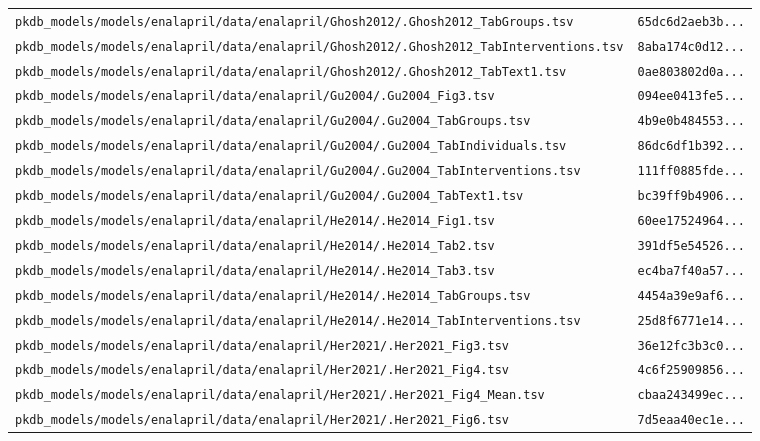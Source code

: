 \begin{longtable}{ll}
\texttt{pkdb\_models/models/enalapril/data/enalapril/Ghosh2012/.Ghosh2012\_TabGroups.tsv} & \texttt{65dc6d2aeb3b...} \\
\texttt{pkdb\_models/models/enalapril/data/enalapril/Ghosh2012/.Ghosh2012\_TabInterventions.tsv} & \texttt{8aba174c0d12...} \\
\texttt{pkdb\_models/models/enalapril/data/enalapril/Ghosh2012/.Ghosh2012\_TabText1.tsv} & \texttt{0ae803802d0a...} \\
\texttt{pkdb\_models/models/enalapril/data/enalapril/Gu2004/.Gu2004\_Fig3.tsv} & \texttt{094ee0413fe5...} \\
\texttt{pkdb\_models/models/enalapril/data/enalapril/Gu2004/.Gu2004\_TabGroups.tsv} & \texttt{4b9e0b484553...} \\
\texttt{pkdb\_models/models/enalapril/data/enalapril/Gu2004/.Gu2004\_TabIndividuals.tsv} & \texttt{86dc6df1b392...} \\
\texttt{pkdb\_models/models/enalapril/data/enalapril/Gu2004/.Gu2004\_TabInterventions.tsv} & \texttt{111ff0885fde...} \\
\texttt{pkdb\_models/models/enalapril/data/enalapril/Gu2004/.Gu2004\_TabText1.tsv} & \texttt{bc39ff9b4906...} \\
\texttt{pkdb\_models/models/enalapril/data/enalapril/He2014/.He2014\_Fig1.tsv} & \texttt{60ee17524964...} \\
\texttt{pkdb\_models/models/enalapril/data/enalapril/He2014/.He2014\_Tab2.tsv} & \texttt{391df5e54526...} \\
\texttt{pkdb\_models/models/enalapril/data/enalapril/He2014/.He2014\_Tab3.tsv} & \texttt{ec4ba7f40a57...} \\
\texttt{pkdb\_models/models/enalapril/data/enalapril/He2014/.He2014\_TabGroups.tsv} & \texttt{4454a39e9af6...} \\
\texttt{pkdb\_models/models/enalapril/data/enalapril/He2014/.He2014\_TabInterventions.tsv} & \texttt{25d8f6771e14...} \\
\texttt{pkdb\_models/models/enalapril/data/enalapril/Her2021/.Her2021\_Fig3.tsv} & \texttt{36e12fc3b3c0...} \\
\texttt{pkdb\_models/models/enalapril/data/enalapril/Her2021/.Her2021\_Fig4.tsv} & \texttt{4c6f25909856...} \\
\texttt{pkdb\_models/models/enalapril/data/enalapril/Her2021/.Her2021\_Fig4\_Mean.tsv} & \texttt{cbaa243499ec...} \\
\texttt{pkdb\_models/models/enalapril/data/enalapril/Her2021/.Her2021\_Fig6.tsv} & \texttt{7d5eaa40ec1e...} \\

\end{longtable}
